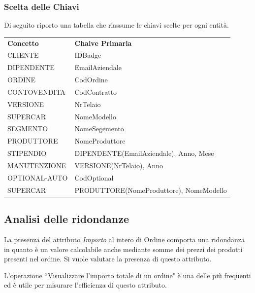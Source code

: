 \documentclass[11pt]{article}
\begin{document}
\subsubsection{Scelta delle Chiavi}

Di seguito riporto una tabella che riassume le chiavi scelte per ogni entità.

\begin{center}
    \begin{table}[htbp]
        \centering
        \small
        \begin{tabularx}{\textwidth}{l l}
            \rowcolor{red!20!}
            \textbf{Concetto} & \textbf{Chaive Primaria}\\
            CLIENTE & IDBadge \\
            DIPENDENTE & EmailAziendale \\
            ORDINE & CodOrdine \\
            CONTOVENDITA & CodContratto \\
            VERSIONE & NrTelaio \\
            SUPERCAR & NomeModello \\
            SEGMENTO & NomeSegemento \\
            PRODUTTORE & NomeProduttore \\
            STIPENDIO & DIPENDENTE(EmailAziendale), Anno, Mese \\
            MANUTENZIONE & VERSIONE(NrTelaio), Anno \\
            OPTIONAL-AUTO & CodOptional \\
            SUPERCAR & PRODUTTORE(NomeProduttore), NomeModello \\
        \end{tabularx}
    \end{table}    
\end{center}

\newpage

\subsection{Analisi delle ridondanze}

La presenza del attributo \textit{Importo} al intero di Ordine comporta una
ridondanza in quanto è un valore calcolabile anche mediante somme dei prezzi dei
prodotti presenti nel ordine. Si vuole valutare la presenza di questo attributo.

L'operazione ``Visualizzare l'importo totale di un ordine" è una delle più
frequenti ed è utile per misurare l'efficienza di questo attributo.
\end{document}

